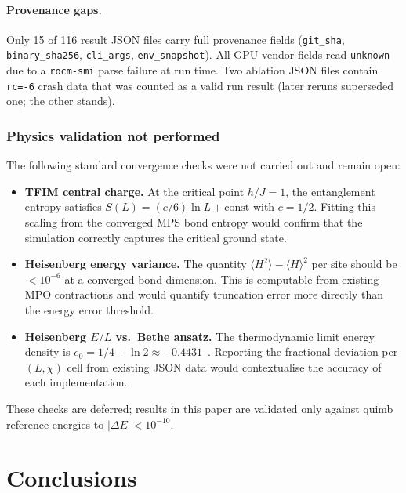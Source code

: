 \documentclass[preprint,12pt]{elsarticle}
\begin{document}
\paragraph{Provenance gaps.}
Only 15 of 116 result JSON files carry full provenance fields (\texttt{git\_sha}, \texttt{binary\_sha256}, \texttt{cli\_args}, \texttt{env\_snapshot}).
All GPU vendor fields read \texttt{unknown} due to a \texttt{rocm-smi} parse failure at run time.
Two ablation JSON files contain \texttt{rc=-6} crash data that was counted as a valid run result (later reruns superseded one; the other stands).

\subsubsection{Physics validation not performed}
\label{sec:physics_not_done}

The following standard convergence checks were not carried out and remain open:
\begin{itemize}
  \item \textbf{TFIM central charge.} At the critical point $h/J = 1$, the entanglement entropy satisfies $S(L) = (c/6)\ln L + \mathrm{const}$ with $c = 1/2$.
  Fitting this scaling from the converged MPS bond entropy would confirm that the simulation correctly captures the critical ground state.
  \item \textbf{Heisenberg energy variance.} The quantity $\langle H^2\rangle - \langle H\rangle^2$ per site should be $< 10^{-6}$ at a converged bond dimension.
  This is computable from existing MPO contractions and would quantify truncation error more directly than the energy error threshold.
  \item \textbf{Heisenberg $E/L$ vs.\ Bethe ansatz.} The thermodynamic limit energy density is $e_0 = 1/4 - \ln 2 \approx -0.4431$~\cite{Bethe1931}.
  Reporting the fractional deviation per $(L, \chi)$ cell from existing JSON data would contextualise the accuracy of each implementation.
\end{itemize}
These checks are deferred; results in this paper are validated only against quimb reference energies to $|\Delta E| < 10^{-10}$.


\section{Conclusions}
\label{sec:conclusions}
\end{document}
